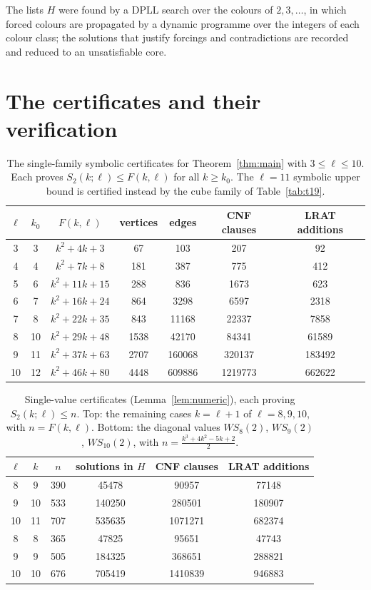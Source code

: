\documentclass[11pt]{amsart}
\theoremstyle{definition}
\newcommand{\F}{F}
\newcommand{\Stwo}{S_2}
\begin{document}
\noindent The lists $H$ were found by a DPLL search over the colours of $2,3,\dots$, in which forced colours are propagated by a dynamic programme over the integers of each colour class; the solutions that justify forcings and contradictions are recorded and reduced to an unsatisfiable core.

\section{The certificates and their verification}\label{sec:verification}

\begin{table}[h]
\centering
\begin{tabular}{ccccccc}
\toprule
$\ell$ & $k_0$ & $\F(k,\ell)$ & vertices & edges & CNF clauses & LRAT additions\\
\midrule
3 & 3 & $k^2+4k+3$ & 67 & 103 & 207 & 92\\
4 & 4 & $k^2+7k+8$ & 181 & 387 & 775 & 412\\
5 & 6 & $k^2+11k+15$ & 288 & 836 & 1673 & 623\\
6 & 7 & $k^2+16k+24$ & 864 & 3298 & 6597 & 2318\\
7 & 8 & $k^2+22k+35$ & 843 & 11168 & 22337 & 7858\\
8 & 10 & $k^2+29k+48$ & 1538 & 42170 & 84341 & 61589\\
9 & 11 & $k^2+37k+63$ & 2707 & 160068 & 320137 & 183492\\
10 & 12 & $k^2+46k+80$ & 4448 & 609886 & 1219773 & 662622\\
\bottomrule
\end{tabular}
\caption{The single-family symbolic certificates for Theorem~\ref{thm:main} with $3\le\ell\le10$. Each proves $\Stwo(k;\ell)\le\F(k,\ell)$ for all $k\ge k_0$. The $\ell=11$ symbolic upper bound is certified instead by the cube family of Table~\ref{tab:t19}.}
\label{tab:certs}
\end{table}

\begin{table}[h]
\centering
\begin{tabular}{cccccc}
\toprule
$\ell$ & $k$ & $n$ & solutions in $H$ & CNF clauses & LRAT additions\\
\midrule
8 & 9 & 390 & 45478 & 90957 & 77148\\
9 & 10 & 533 & 140250 & 280501 & 180907\\
10 & 11 & 707 & 535635 & 1071271 & 682374\\
\midrule
8 & 8 & 365 & 47825 & 95651 & 47743\\
9 & 9 & 505 & 184325 & 368651 & 288821\\
10 & 10 & 676 & 705419 & 1410839 & 946883\\
\bottomrule
\end{tabular}
\caption{Single-value certificates (Lemma~\ref{lem:numeric}), each proving $\Stwo(k;\ell)\le n$. Top: the remaining cases $k=\ell+1$ of $\ell=8,9,10$, with $n=\F(k,\ell)$. Bottom: the diagonal values $WS_8(2)$, $WS_9(2)$, $WS_{10}(2)$, with $n=\frac{k^3+4k^2-5k+2}{2}$.}
\label{tab:single}
\end{table}
\end{document}
